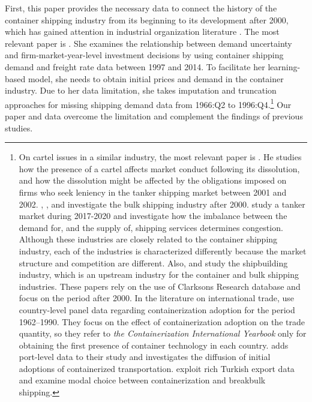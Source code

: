 \documentclass[11pt]{article}
\begin{document}
First, this paper provides the necessary data to connect the history of the container shipping industry from its beginning to its development after 2000, which has gained attention in industrial organization literature \citep{aguirregabiria2021dynamic}. The most relevant paper is \cite{jeon2022learning}. She examines the relationship between demand uncertainty and firm-market-year-level investment decisions by using container shipping demand and freight rate data between 1997 and 2014. To facilitate her learning-based model, she needs to obtain initial prices and demand in the container industry. Due to her data limitation, she takes imputation and truncation approaches for missing shipping demand data from 1966:Q2 to 1996:Q4.\footnote{On cartel issues in a similar industry, the most relevant paper is \cite{asker2010leniency}. He studies how the presence of a cartel affects market conduct following its dissolution, and how the dissolution might be affected by the obligations imposed on firms who seek leniency in the tanker shipping market between 2001 and 2002. \cite{kalouptsidi2014aer}, \cite{brancaccio2020geography}, and \cite{greenwood2015waves} investigate the bulk shipping industry after 2000. \cite{bai2021congestion} study a tanker market during 2017-2020 and investigate how the imbalance between the demand for, and the supply of, shipping services
determines congestion. Although these industries are closely related to the container shipping industry, each of the industries is characterized differently because the market structure and competition are different. Also, \cite{kalouptsidi2017res} and \cite{barwick2019china} study the shipbuilding industry, which is an upstream industry for the container and bulk shipping industries. These papers rely on the use of Clarksons Research database and focus on the period after 2000. In the literature on international trade, \cite{bernhofen2016estimating} use country-level panel data regarding containerization adoption for the period 1962–1990. They focus on the effect of containerization adoption on the trade quantity, so they refer to \textit{the Containerization International Yearbook} only for obtaining the first presence of container technology in each country. \cite{rua2014diffusion} adds port-level data to their study and investigates the diffusion of initial adoptions of containerized transportation. \cite{cocsar2018shipping} exploit rich Turkish export data and examine modal choice between containerization and breakbulk shipping.} Our paper and data overcome the limitation and complement the findings of previous studies.  
\end{document}
